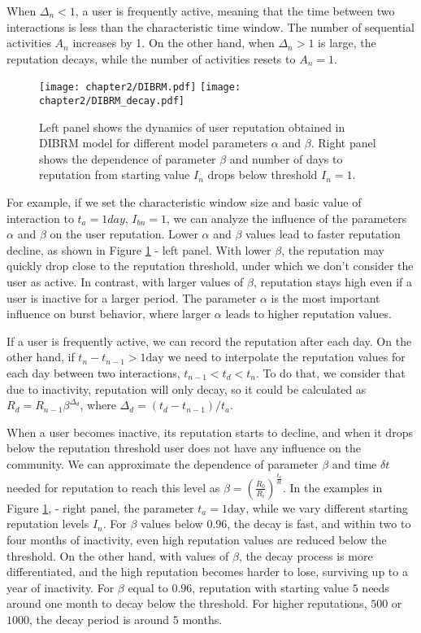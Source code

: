 When $\Delta_{n}<1$, a user is frequently active, meaning that the time between two interactions is less than the characteristic time window. The number of sequential activities $A_n$ increases by 1. On the other hand, when $\Delta_n>1$ is large, the reputation decays, while the number of activities resets to $A_n=1$. 

\begin{figure}[h]
	\centering
	\texttt{[image: chapter2/DIBRM.pdf]}
	\texttt{[image: chapter2/DIBRM\_decay.pdf]}
	\caption[User reputations.]{Left panel shows the dynamics of user reputation obtained in DIBRM model for different model parameters $\alpha$ and $\beta$. Right panel shows the dependence of parameter $\beta$ and number of days to reputation from starting value $I_n$ drops below threshold $I_n=1$.}
	\label{fig:reputation}
\end{figure}  

For example, if we set the characteristic window size and basic value of interaction to $t_a=1 day$, $I_{bn}=1$, we can analyze the influence of the parameters $\alpha$ and $\beta$ on the user reputation. Lower $\alpha$ and $\beta$ values lead to faster reputation decline, as shown in Figure \ref{fig:reputation} - left panel. With lower $\beta$, the reputation may quickly drop close to the reputation threshold, under which we don't consider the user as active. In contrast, with larger values of $\beta$, reputation stays high even if a user is inactive for a larger period. The parameter $\alpha$ is the most important influence on burst behavior, where larger $\alpha$ leads to higher reputation values. 

If a user is frequently active, we can record the reputation after each day. On the other hand, if $t_n-t_{n-1}>1 \text{day}$ we need to interpolate the reputation values for each day between two interactions, $t_{n-1}<t_d<t_{n}$. To do that, we consider that due to inactivity, reputation will only decay, so it could be calculated as $R_d = R_{n-1}\beta^{\Delta_d}$, where $\Delta_d=(t_{d}-t_{n-1})/t_a$. 

When a user becomes inactive, its reputation starts to decline, and when it drops below the reputation threshold user does not have any influence on the community. We can approximate the dependence of parameter $\beta$ and time $\delta t$ needed for reputation to reach this level as $\beta = (\frac{R_0}{R_i})^{\frac{t_a}{\delta t}}$. In the examples in Figure \ref{fig:reputation}, - right panel, the parameter $t_a=1\text{day}$, while we vary different starting reputation levels $I_n$.   
For $\beta$ values below $0.96$, the decay is fast, and within two to four months of inactivity, even high reputation values are
reduced below the threshold. On the other hand, with values of $\beta$, the decay process is more differentiated, and the high
reputation becomes harder to lose, surviving up to a year of inactivity. For $\beta$ equal to $0.96$, reputation with starting value $5$ needs around one month to decay below the threshold. For higher reputations, $500$ or $1000$, the decay period is around $5$ months. 

